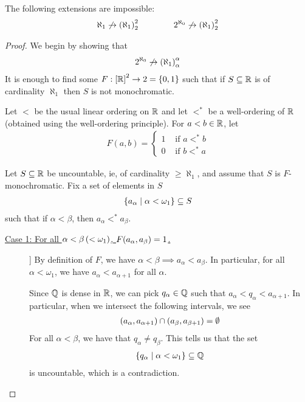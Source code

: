 \begin{boxtheorem}[Sierpiński]
    The following extensions are impossible:
    \begin{align*}
        \aleph_1 \not\to \left( \aleph_1 \right)_{2}^{2}
        \qquad \qquad
        2^{\aleph_0} \not\to \left( \aleph_1 \right)_2^2
    \end{align*}
\end{boxtheorem}
\begin{proof}
    We begin by showing that
    \begin{align*}
        2^{\aleph_0} \not\to \left( \aleph_1 \right)_{\alpha}^{\alpha}
    \end{align*}
    It is enough to find some $F : \left[ \mathbb{R} \right]^2 \to 2 = \left\{ 0, 1 \right\}$ such that if $S \subseteq \mathbb{R}$ is of cardinality $\aleph_1$ then $S$ is not monochromatic.

    Let $<$ be the usual linear ordering on $\mathbb{R}$ and let $<^*$ be a well-ordering of $\mathbb{R}$ (obtained using the well-ordering principle). For $a < b \in \mathbb{R}$, let
    \begin{align*}
        F(a, b) = 
        \begin{cases}
            1 & \text{ if } a <^* b \\
            0 & \text{ if } b <^* a
        \end{cases}
    \end{align*}

    Let $S \subseteq \mathbb{R}$ be uncountable, ie, of cardinality $\geq \aleph_1$, and assume that $S$ is $F$-monochromatic. Fix a set of elements in $S$
    \begin{align*}
        \left\{ a_{\alpha} \; \middle\vert \; \alpha < \omega_1 \right\} \subseteq S
    \end{align*}
    such that if $\alpha < \beta$, then $a_{\alpha} <^* a_{\beta}$.

    \begin{description}
        \item[\underline{Case 1: For all $\alpha < \beta \left( < \omega_1 \right)$, $F\!\left( a_{\alpha}, a_{\beta} \right) = 1$.}]]
        By definition of $F$, we have $\alpha < \beta \implies a_{\alpha} < a_{\beta}$.  In particular, for all $\alpha < \omega_1$, we have $a_{\alpha} < a_{\alpha + 1}$ for all $\alpha$.

        Since $\mathbb{Q}$ is dense in $\mathbb{R}$, we can pick $q_{\alpha} \in \mathbb{Q}$ such that $a_{\alpha} < q_{\alpha} < a_{\alpha + 1}$. In particular, when we intersect the following intervals, we see
        \begin{align*}
            \left( a_{\alpha}, a_{\alpha + 1} \right) \cap \left( a_{\beta}, a_{\beta + 1} \right) = \emptyset
        \end{align*}
        For all $\alpha < \beta$, we have that $q_{\alpha} \neq q_{\beta}$. This tells us that the set
        \begin{align*}
            \left\{ q_{\alpha} \; \middle\vert \; \alpha < \omega_1 \right\} \subseteq \mathbb{Q}
        \end{align*}
        is uncountable, which is a contradiction.


\end{description}
\end{proof}
